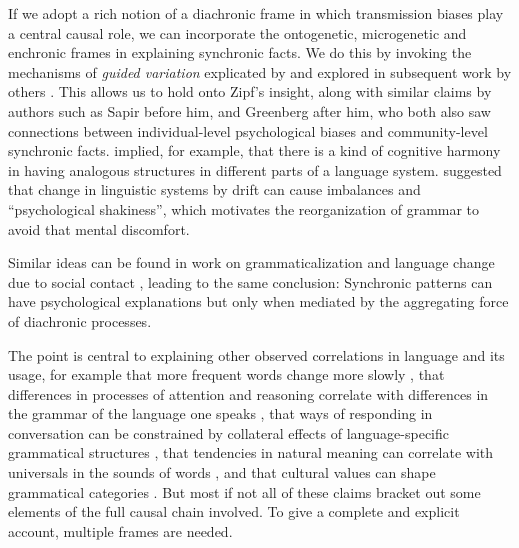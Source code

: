 If we adopt a rich notion of a diachronic frame in which transmission 
biases play a central causal role, we can incorporate the ontogenetic, 
microgenetic and enchronic frames in explaining synchronic facts. We do this by invoking the mechanisms of \textit{guided variation} explicated by 
\citet{boyd_culture_1985,boyd_origin_2005} and explored in subsequent work by 
others \citep{kirby_function_1999,kirby_ug_2004,christiansen_language_2008,chater_language_2010}. This allows us to hold 
onto Zipf's insight, along with similar claims by authors such as 
Sapir before him, and Greenberg after him, who both also saw connections 
between individual-level psychological biases and community-level synchronic facts. \citet{greenberg_universals_1966} implied, for example, that there is a kind of cognitive 
harmony in having analogous structures in different parts of a language 
system. \citet[154--158]{sapir_language:_1921} suggested that change in linguistic 
systems by drift can cause imbalances and ``psychological 
shakiness'', which motivates the reorganization of grammar to avoid 
that mental discomfort. 



Similar ideas can be found in work on grammaticalization \citep{givon_syntax:_1984,bybee_language_2010} and language change due to social contact \citep{weinreich_languages_1953}, leading to the same conclusion: Synchronic patterns can have 
psychological explanations but only when mediated by the aggregating 
force of diachronic processes. 



The point is central to explaining other observed 
correlations in language and its usage, for example that more frequent words change more slowly 
\citep{pagel_frequency_2007}, that differences in processes of 
attention and reasoning correlate with differences in the grammar of the 
language one speaks \citep{whorf_language_1956,lucy_language_1992,slobin_thought_1996}, 
that ways of responding in conversation can be constrained by collateral 
effects of language-specific grammatical structures \citep{sidnell_language_2012}, that tendencies in natural meaning can correlate with universals in the sounds of words \citep{dingemanse_is_2013}, and that cultural values can shape grammatical categories \citep{hale_notes_1986,wierzbicka_semantics_1992,chafe_loci_2000,enfield_ethnosyntax:_2002,everett_cultural_2005,everett_language:_2012}. But most if not all of these claims bracket out some elements of the full 
causal chain involved. To give a complete and explicit account, multiple frames are needed.





 \newpage